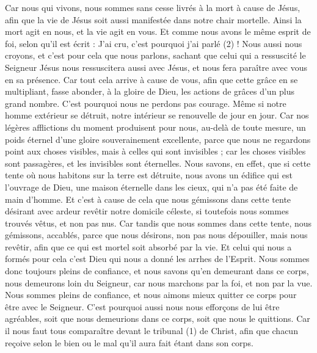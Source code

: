 \begin{multicols}{2}
Car nous qui vivons, nous sommes sans cesse livrés à la mort à cause de Jésus, afin que la vie de Jésus soit aussi manifestée dans notre chair mortelle.
Ainsi la mort agit en nous, et la vie agit en vous.
Et comme nous avons le même esprit de foi, selon qu'il est écrit : J'ai cru, c'est pourquoi j'ai parlé (2) ! Nous aussi nous croyons, et c'est pour cela que nous parlons,
sachant que celui qui a ressuscité le Seigneur Jésus nous ressuscitera aussi avec Jésus, et nous fera paraître avec vous en sa présence.
Car tout cela arrive à cause de vous, afin que cette grâce en se multipliant, fasse abonder, à la gloire de Dieu, les actions de grâces d’un plus grand nombre.
C'est pourquoi nous ne perdons pas courage. Même si notre homme extérieur se détruit, notre intérieur se renouvelle de jour en jour.
Car nos légères afflictions du moment produisent pour nous, au-delà de toute mesure, un poids éternel d'une gloire souverainement excellente,
parce que nous ne regardons point aux choses visibles, mais à celles qui sont invisibles ; car les choses visibles sont passagères, et les invisibles sont éternelles.
\VerseOne{}Nous savons, en effet, que si cette tente où nous habitons sur la terre est détruite, nous avons un édifice qui est l’ouvrage de Dieu, une maison éternelle dans les cieux, qui n’a pas été faite de main d’homme.
Et c'est à cause de cela que nous gémissons dans cette tente désirant avec ardeur revêtir notre domicile céleste,
si toutefois nous sommes trouvés vêtus, et non pas nus.
Car tandis que nous sommes dans cette tente, nous gémissons, accablés, parce que nous désirons, non pas nous dépouiller, mais nous revêtir, afin que ce qui est mortel soit absorbé par la vie.
Et celui qui nous a formés pour cela c'est Dieu qui nous a donné les arrhes de l'Esprit.
Nous sommes donc toujours pleins de confiance, et nous savons qu’en demeurant dans ce corps, nous demeurons loin du Seigneur,
car nous marchons par la foi, et non par la vue.
Nous sommes pleins de confiance, et nous aimons mieux quitter ce corps pour être avec le Seigneur.
C'est pourquoi aussi nous nous efforçons de lui être agréables, soit que nous demeurions dans ce corps, soit que nous le quittions.
Car il nous faut tous comparaître devant le tribunal (1) de Christ, afin que chacun reçoive selon le bien ou le mal qu’il aura fait étant dans son corps.

\end{multicols}
